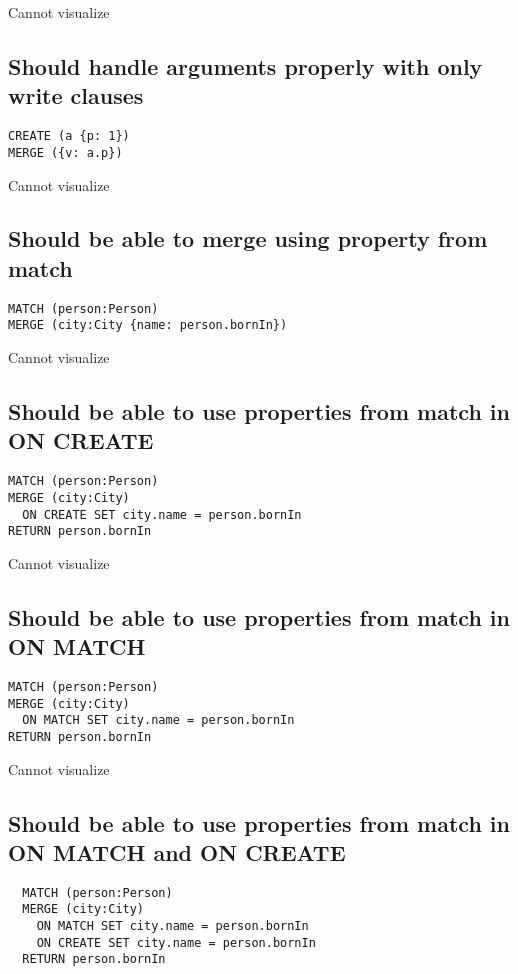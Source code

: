 Cannot visualize
\subsection{Should handle arguments properly with only write clauses}

\begin{lstlisting}
CREATE (a {p: 1})
MERGE ({v: a.p})
\end{lstlisting}

Cannot visualize
\subsection{Should be able to merge using property from match}

\begin{lstlisting}
MATCH (person:Person)
MERGE (city:City {name: person.bornIn})
\end{lstlisting}

Cannot visualize
\subsection{Should be able to use properties from match in ON CREATE}

\begin{lstlisting}
MATCH (person:Person)
MERGE (city:City)
  ON CREATE SET city.name = person.bornIn
RETURN person.bornIn
\end{lstlisting}

Cannot visualize
\subsection{Should be able to use properties from match in ON MATCH}

\begin{lstlisting}
MATCH (person:Person)
MERGE (city:City)
  ON MATCH SET city.name = person.bornIn
RETURN person.bornIn
\end{lstlisting}

Cannot visualize
\subsection{Should be able to use properties from match in ON MATCH and ON CREATE}

\begin{lstlisting}
  MATCH (person:Person)
  MERGE (city:City)
    ON MATCH SET city.name = person.bornIn
    ON CREATE SET city.name = person.bornIn
  RETURN person.bornIn
\end{lstlisting}

